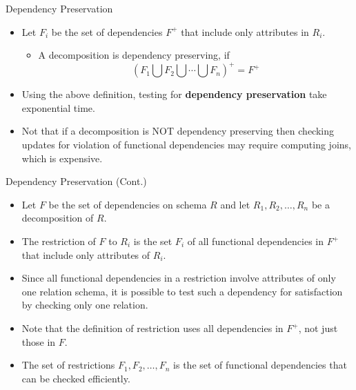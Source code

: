 \documentclass{beamer}
\begin{document}
\begin{frame}{Dependency Preservation}
    \begin{itemize}
        \item Let $F_i$ be the set of dependencies $F^+$ that include only attributes in $R_i$.
            \begin{itemize}
                \item A decomposition is dependency preserving, if
                    $$
                        (F_1 \bigcup F_2 \bigcup \cdots \bigcup F_n )^+ = F^+
                    $$
            \end{itemize}

        \item Using the above definition, testing for \textbf{dependency preservation} take exponential time.
        \item Not that if a decomposition is NOT dependency preserving then checking updates for violation of functional dependencies may require computing joins, which is expensive.
    \end{itemize}
\end{frame}

\begin{frame}{Dependency Preservation (Cont.)}
    \begin{itemize}
        \item Let $F$ be the set of dependencies on schema $R$ and let $R_1, R_2, \ldots, R_n$ be a decomposition of $R$.
        \item The restriction of $F$ to $R_i$ is the set $F_i$ of all functional dependencies in $F^+$ that include only attributes of $R_i$.
        \item Since all functional dependencies in a restriction involve attributes of only one relation schema, it is possible to test such a dependency for satisfaction by checking only one relation.
        \item Note that the definition of restriction uses all dependencies in $F^+$, not just those in $F$.
        \item The set of restrictions $F_1, F_2 , \ldots, F_n$ is the set of functional dependencies that can be checked efficiently.
    \end{itemize}
\end{frame}
\end{document}
